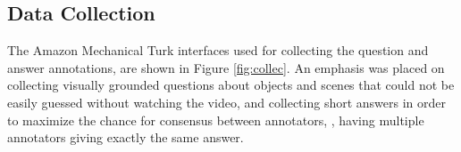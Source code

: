 \subsection{Data Collection}
The Amazon Mechanical Turk interfaces used for collecting the question and answer annotations, are shown in Figure \ref{fig:collec}.  
An emphasis was placed on collecting visually grounded questions about objects and scenes that could not be easily guessed without watching the video, and collecting short answers in order to maximize the chance for consensus between annotators, \ie, having multiple annotators giving exactly the same answer.

\begin{table*}[t]
\setlength\tabcolsep{4.5pt}
\begin{center}
\vspace{-0.3cm}
\caption{\small Comparison of our training on \datasetname{} with cross-dataset transfer using the previously largest open-ended VideoQA dataset (MSRVTT-QA) and the largest manually annotated open-ended VideoQA dataset (ActivityNet-QA).}
\vspace{-0.5cm}
\label{table:transfer}
\end{center}
\end{table*}

